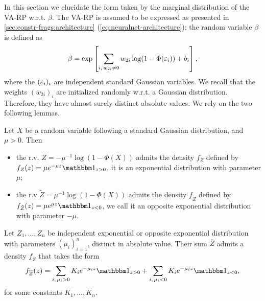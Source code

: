 In this section we elucidate the form taken by the marginal distribution of the VA-RP w.r.t. $\beta$.
The VA-RP is assumed to be expressed as presented in \cref{sec:constr-frags:architecture} (\cref{eq:neuralnet-architecture}): the random variable $\beta$ is defined as
    \begin{equation}\label{eq:app-expr-beta}
        \beta = \exp\left[\sum_{i,\,w_{2i}\ne0}w_{2i}\log(1-\Phi(\varepsilon_i)) + b_i\right],
    \end{equation}
where the $(\varepsilon_i)_i$ are independent standard Gaussian variables.
We recall that the weights $(w_{2i})_{i}$ are initialized randomly w.r.t. a Gaussian distribution. Therefore, they have almost surely 
distinct absolute values.
We rely on the two following lemmas.
\begin{lem}\label{lemma:expon-distrib}
    Let $X$ be a random variable following a standard Gaussian distribution, and $\mu>0$. Then
    \begin{itemize}
        \item the r.v. $Z=-\mu^{-1}\log(1-\Phi(X))$ admits the density $f_Z$ defined by $f_Z(z)=\mu e^{-\mu z}\indic_{z>0}$, it is an exponential distribution with parameter $\mu$;
        \item the r.v $\tilde Z=\mu^{-1}\log(1-\Phi(X))$ admits the density $f_{\tilde Z}$ defined by $f_{\tilde Z}(z)= \mu e^{\mu z}\indic_{z<0}$, we call it an opposite exponential distribution with parameter $-\mu$.
    \end{itemize}
\end{lem}
\begin{lem}\label{lemma:sum-of-expon}
    Let $Z_1,\dots,Z_n$ be independent exponential or opposite exponential distribution with parameters $(\mu_{i})_{i=1}^n$, distinct in absolute value. Their sum $\overline{Z}$ admits a density $f_{\overline{Z}}$ that takes the form
        \begin{equation}\label{eq:lem-pdf-Z}
            f_{\overline{Z}}(z) = \sum_{i,\,\mu_i>0}K_ie^{-\mu_i z}\indic_{z>0} + \sum_{i,\,\mu_i<0}K_ie^{-\mu_iz}\indic_{z<0},
        \end{equation}
    for some constants $K_1,\dots,K_n$.
\end{lem}


